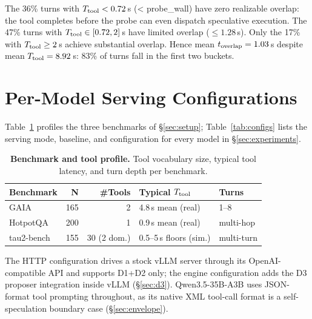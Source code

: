 \begin{center}
\end{center}

The 36\% turns with $T_{\mathrm{tool}} < 0.72$\,s (< probe\_wall) have zero realizable overlap: the tool completes before the probe can even dispatch speculative execution.
The 47\% turns with $T_{\mathrm{tool}} \in [0.72, 2]$\,s have limited overlap ($\leq 1.28$\,s).
Only the 17\% with $T_{\mathrm{tool}} \geq 2$\,s achieve substantial overlap.
Hence mean $t_{\mathrm{overlap}} = 1.03$\,s despite mean $T_{\mathrm{tool}} = 8.92$\,s: 83\% of turns fall in the first two buckets.

\section{Per-Model Serving Configurations}
\label{app:configs}

Table~\ref{tab:benchmarks} profiles the three benchmarks of \S\ref{sec:setup};
Table~\ref{tab:configs} lists the serving mode, baseline, and \spork{} configuration
for every model in \S\ref{sec:experiments}.

\begin{table}[h]
\caption{\textbf{Benchmark and tool profile.} Tool vocabulary size, typical tool
latency, and turn depth per benchmark.}
\label{tab:benchmarks}
\centering
\footnotesize
\begin{tabular}{@{}lrrll@{}}
\toprule
Benchmark & N & \#Tools & Typical $T_{\mathrm{tool}}$ & Turns \\
\midrule
GAIA       & 165 & 2 & 4.8\,s mean (real)      & 1--8 \\
HotpotQA   & 200 & 1 & 0.9\,s mean (real)      & multi-hop \\
tau2-bench & 155 & 30 (2 dom.) & 0.5--5\,s floors (sim.) & multi-turn \\
\bottomrule
\end{tabular}
\end{table}
The HTTP configuration drives a stock vLLM server through its OpenAI-compatible API
and supports D1+D2 only; the engine configuration adds the D3 proposer integration
inside vLLM (\S\ref{sec:d3}).
Qwen3.5-35B-A3B uses JSON-format tool prompting throughout, as its native XML
tool-call format is a self-speculation boundary case (\S\ref{sec:envelope}).

